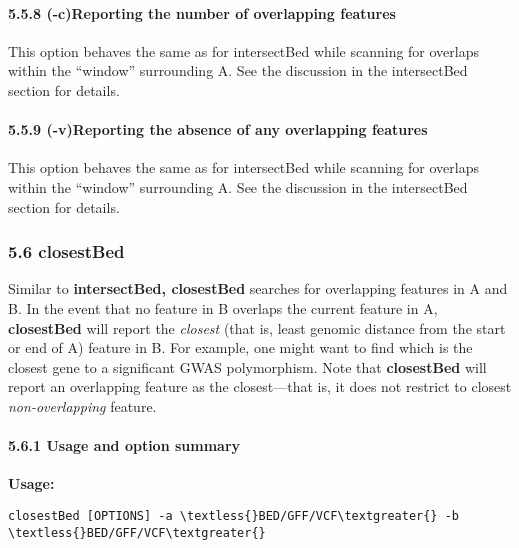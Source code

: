\documentclass[letterpaper,10pt,english]{sphinxmanual}
\begin{document}
\paragraph{5.5.8 (-c)Reporting the number of overlapping features}
\label{content/windowBed:c-reporting-the-number-of-overlapping-features}
This option behaves the same as for intersectBed while scanning for overlaps within the ``window''
surrounding A. See the discussion in the intersectBed section for details.


\paragraph{5.5.9 (-v)Reporting the absence of any overlapping features}
\label{content/windowBed:v-reporting-the-absence-of-any-overlapping-features}
This option behaves the same as for intersectBed while scanning for overlaps within the ``window''
surrounding A. See the discussion in the intersectBed section for details.


\subsubsection{5.6 closestBed}
\label{content/closestBed:closestbed}\label{content/closestBed::doc}
Similar to \textbf{intersectBed, closestBed} searches for overlapping features in A and B. In the event that
no feature in B overlaps the current feature in A, \textbf{closestBed} will report the \emph{closest} (that is, least
genomic distance from the start or end of A) feature in B. For example, one might want to find which
is the closest gene to a significant GWAS polymorphism. Note that \textbf{closestBed} will report an
overlapping feature as the closest---that is, it does not restrict to closest \emph{non-overlapping} feature.


\paragraph{5.6.1 Usage and option summary}
\label{content/closestBed:usage-and-option-summary}
\textbf{Usage:}

\begin{Verbatim}[commandchars=\\\{\}]
closestBed [OPTIONS] -a \textless{}BED/GFF/VCF\textgreater{} -b \textless{}BED/GFF/VCF\textgreater{}
\end{Verbatim}
\end{document}
